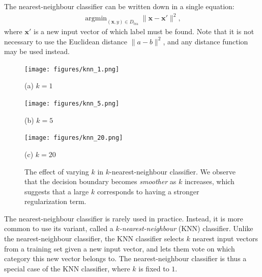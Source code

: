 \documentclass{report}
\newcommand{\vect}[1]{\mathbf{#1}}
\newcommand{\vx}[0]{\vect{x}}
\DeclareMathOperator*{\argmin}{\arg \min}
\begin{document}
The nearest-neighbour classifier can be written down in a single equation:
\begin{align*}
    \argmin_{(\vx, y) \in D_{\text{tra}}} \| \vx - \vx' \|^2,
\end{align*}
where $\vx'$ is a new input vector of which label must be found. Note that it is
not necessary to use the Euclidean distance $\| a - b \|^2$, and any distance
function may be used instead.

\begin{figure}[t]
    \begin{minipage}{0.32\textwidth}
        \centering
        \texttt{[image: figures/knn\_1.png]}

        (a) $k=1$
    \end{minipage}
    \hfill
    \begin{minipage}{0.32\textwidth}
        \centering
        \texttt{[image: figures/knn\_5.png]}

        (b) $k=5$
    \end{minipage}
    \hfill
    \begin{minipage}{0.32\textwidth}
        \centering
        \texttt{[image: figures/knn\_20.png]}

        (c) $k=20$
    \end{minipage}

    \caption{
        \label{fig:knn}
        The effect of varying $k$ in $k$-nearest-neighbour classifier. We
        observe that the decision boundary becomes {\it smoother} as $k$
        increases, which suggests that a large $k$ corresponds to having a
        stronger regularization term.
    }
\end{figure}

The nearest-neighbour classifier is rarely used in practice. Instead, it is more
common to use its variant, called a {\it $k$-nearest-neighbour} (KNN)
classifier.  Unlike the nearest-neighbour classifier, the KNN classifier selects
$k$ nearest input vectors from a training set given a new input vector, and lets
them vote on which category this new vector belongs to. The nearest-neighbour
classifier is thus a special case of the KNN classifier, where $k$ is fixed to
$1$. 
\end{document}
